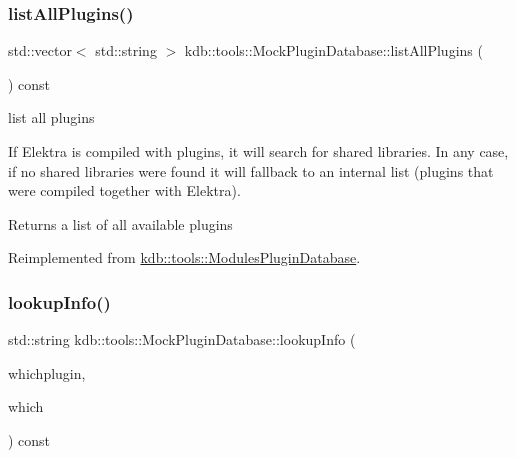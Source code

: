 \mbox{\label{classkdb_1_1tools_1_1MockPluginDatabase_a3663848683953bfad7123c48c00ab404}} 
\subsubsection{\texorpdfstring{listAllPlugins()}{listAllPlugins()}}
{\footnotesize\ttfamily std\+::vector$<$ std\+::string $>$ kdb\+::tools\+::\+Mock\+Plugin\+Database\+::list\+All\+Plugins (\begin{DoxyParamCaption}{ }\end{DoxyParamCaption}) const\hspace{0.3cm}{\ttfamily [virtual]}}



list all plugins 

If Elektra is compiled with plugins, it will search for shared libraries. In any case, if no shared libraries were found it will fallback to an internal list (plugins that were compiled together with Elektra).

\begin{DoxyReturn}{Returns}
a list of all available plugins 
\end{DoxyReturn}


Reimplemented from \mbox{\hyperlink{classkdb_1_1tools_1_1ModulesPluginDatabase_a3fa5a08caf47cb79f9889641a96f197b}{kdb\+::tools\+::\+Modules\+Plugin\+Database}}.

\mbox{\label{classkdb_1_1tools_1_1MockPluginDatabase_ae352c27aa51bc8c2ea8c708d14f6fc76}} 
\subsubsection{\texorpdfstring{lookupInfo()}{lookupInfo()}}
{\footnotesize\ttfamily std\+::string kdb\+::tools\+::\+Mock\+Plugin\+Database\+::lookup\+Info (\begin{DoxyParamCaption}\item[{\mbox{\hyperlink{classkdb_1_1tools_1_1PluginSpec}{Plugin\+Spec}} const \&}]{whichplugin,  }\item[{std\+::string const \&}]{which }\end{DoxyParamCaption}) const\hspace{0.3cm}{\ttfamily [virtual]}}



